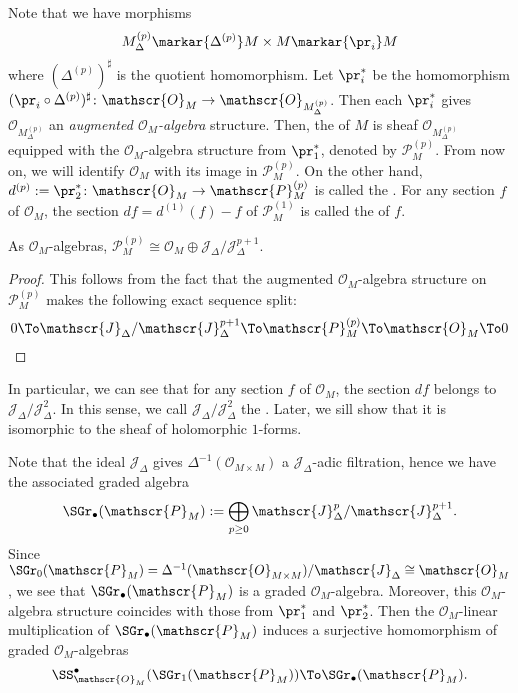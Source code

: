 Note that we have morphisms
\[
M_\Delta^{(p)}\markar{\Delta^{(p)}}M\times M\markar{\pr_i}M
\]
where $(\Delta^{(p)})^\sharp$ is the quotient homomorphism. 
Let $\pr_i^\ast$ be the homomorphism 
$(\pr_i\circ\Delta^{(p)})^\sharp\colon
\mathscr{O}_M\to\mathscr{O}_{M_\Delta^{(p)}}$. 
Then each $\pr_i^\ast$ gives 
$\mathscr{O}_{M_\Delta^{(p)}}$ an 
\emph{augmented $\mathscr{O}_M$-algebra} structure. 
Then, the  of $M$ is sheaf 
$\mathscr{O}_{M_\Delta^{(p)}}$ equipped with 
the $\mathscr{O}_M$-algebra structure from $\pr_1^\ast$, 
denoted by $\mathscr{P}_M^{(p)}$. 
From now on, we will identify $\mathscr{O}_M$ with its image in $\mathscr{P}_M^{(p)}$.
On the other hand, 
$d^{(p)}:=\pr_2^\ast\colon\mathscr{O}_M\to\mathscr{P}_M^{(p)}$ 
is called the . 
For any section $f$ of $\mathscr{O}_M$, 
the section $df=d^{(1)}(f)-f$ of $\mathscr{P}_M^{(1)}$ is called the  of $f$.

\begin{lem}
As $\mathscr{O}_M$-algebras, 
$\mathscr{P}_M^{(p)}\cong
\mathscr{O}_M\oplus\mathscr{J}_\Delta/\mathscr{J}_\Delta^{p+1}$.
\end{lem}
\begin{proof}
This follows from the fact that the augmented $\mathscr{O}_M$-algebra structure 
on $\mathscr{P}_M^{(p)}$ makes the following exact sequence split:
\[
0\To\mathscr{J}_\Delta/\mathscr{J}_\Delta^{p+1}\To
\mathscr{P}_M^{(p)}\To\mathscr{O}_M\To0
\]
\end{proof}

In particular, we can see that for any section $f$ of $\mathscr{O}_M$, 
the section $df$ belongs to $\mathscr{J}_\Delta/\mathscr{J}_\Delta^2$. 
In this sense, we call $\mathscr{J}_\Delta/\mathscr{J}_\Delta^2$ the 
. %
Later, we sill show that it is isomorphic to the sheaf of holomorphic $1$-forms. 

Note that the ideal $\mathscr{J}_\Delta$ gives 
$\Delta^{-1}(\mathscr{O}_{M\times M})$ a $\mathscr{J}_\Delta$-adic filtration, 
hence we have the associated graded algebra
\begin{equation}\label{eq:SGr(P)}
\SGr_\bullet(\mathscr{P}_M):=
\bigoplus_{p\ge0}\mathscr{J}_\Delta^p/\mathscr{J}_\Delta^{p+1}.
\end{equation}
Since $\SGr_0(\mathscr{P}_M)=
\Delta^{-1}(\mathscr{O}_{M\times M})/\mathscr{J}_\Delta\cong\mathscr{O}_M$, 
we see that $\SGr_\bullet(\mathscr{P}_M)$ is a graded $\mathscr{O}_M$-algebra. 
Moreover, this $\mathscr{O}_M$-algebra structure coincides with those 
from $\pr_1^\ast$ and $\pr_2^\ast$. 
Then the $\mathscr{O}_M$-linear multiplication of $\SGr_\bullet(\mathscr{P}_M)$ 
induces a surjective homomorphism of graded $\mathscr{O}_M$-algebras
\[
\SS_{\mathscr{O}_M}^\bullet(\SGr_1(\mathscr{P}_M))\To\SGr_\bullet(\mathscr{P}_M).
\]

